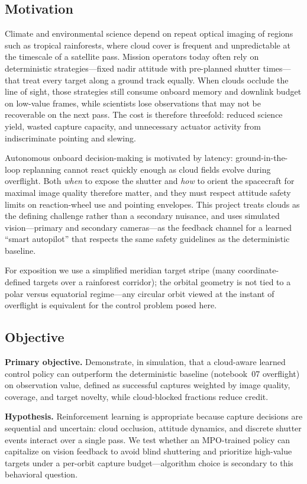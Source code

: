 \subsection{Motivation}
Climate and environmental science depend on repeat optical imaging of regions such as tropical rainforests, where cloud cover is frequent and unpredictable at the timescale of a satellite pass.
Mission operators today often rely on deterministic strategies---fixed nadir attitude with pre-planned shutter times---that treat every target along a ground track equally.
When clouds occlude the line of sight, those strategies still consume onboard memory and downlink budget on low-value frames, while scientists lose observations that may not be recoverable on the next pass.
The cost is therefore threefold: reduced science yield, wasted capture capacity, and unnecessary actuator activity from indiscriminate pointing and slewing.

Autonomous onboard decision-making is motivated by latency: ground-in-the-loop replanning cannot react quickly enough as cloud fields evolve during overflight.
Both \emph{when} to expose the shutter and \emph{how} to orient the spacecraft for maximal image quality therefore matter, and they must respect attitude safety limits on reaction-wheel use and pointing envelopes.
This project treats clouds as the defining challenge rather than a secondary nuisance, and uses simulated vision---primary and secondary cameras---as the feedback channel for a learned ``smart autopilot'' that respects the same safety guidelines as the deterministic baseline.

For exposition we use a simplified meridian target stripe (many coordinate-defined targets over a rainforest corridor); the orbital geometry is not tied to a polar versus equatorial regime---any circular orbit viewed at the instant of overflight is equivalent for the control problem posed here.

\subsection{Objective}
\textbf{Primary objective.}
Demonstrate, in simulation, that a cloud-aware learned control policy can outperform the deterministic baseline (notebook~07 overflight) on observation value, defined as successful captures weighted by image quality, coverage, and target novelty, while cloud-blocked fractions reduce credit.

\textbf{Hypothesis.}
Reinforcement learning is appropriate because capture decisions are sequential and uncertain: cloud occlusion, attitude dynamics, and discrete shutter events interact over a single pass.
We test whether an MPO-trained policy can capitalize on vision feedback to avoid blind shuttering and prioritize high-value targets under a per-orbit capture budget---algorithm choice is secondary to this behavioral question.

